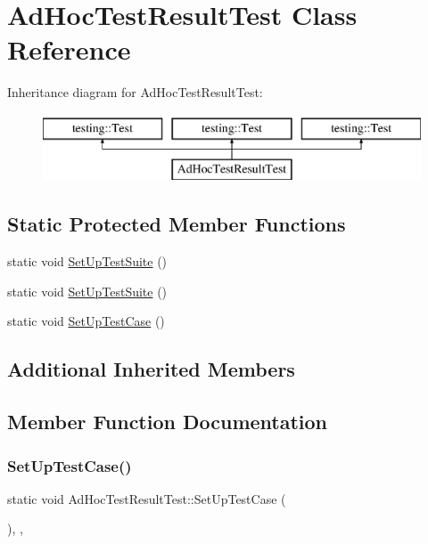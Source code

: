 \hypertarget{class_ad_hoc_test_result_test}{}\section{Ad\+Hoc\+Test\+Result\+Test Class Reference}
\label{class_ad_hoc_test_result_test}
Inheritance diagram for Ad\+Hoc\+Test\+Result\+Test\+:\begin{figure}[H]
\begin{center}
\leavevmode
\includegraphics[height=2.000000cm]{d7/d31/class_ad_hoc_test_result_test}
\end{center}
\end{figure}
\subsection*{Static Protected Member Functions}
\begin{DoxyCompactItemize}
\item 
static void \mbox{\hyperlink{class_ad_hoc_test_result_test_a4a66200ff2ff1cdaddd299dd006351f6}{Set\+Up\+Test\+Suite}} ()
\item 
static void \mbox{\hyperlink{class_ad_hoc_test_result_test_a4a66200ff2ff1cdaddd299dd006351f6}{Set\+Up\+Test\+Suite}} ()
\item 
static void \mbox{\hyperlink{class_ad_hoc_test_result_test_a0955d04d3dd7994561930c83489914a3}{Set\+Up\+Test\+Case}} ()
\end{DoxyCompactItemize}
\subsection*{Additional Inherited Members}


\subsection{Member Function Documentation}
\mbox{\label{class_ad_hoc_test_result_test_a0955d04d3dd7994561930c83489914a3}} 
\subsubsection{\texorpdfstring{SetUpTestCase()}{SetUpTestCase()}}
{\footnotesize\ttfamily static void Ad\+Hoc\+Test\+Result\+Test\+::\+Set\+Up\+Test\+Case (\begin{DoxyParamCaption}{ }\end{DoxyParamCaption})\hspace{0.3cm}{\ttfamily [inline]}, {\ttfamily [static]}, {\ttfamily [protected]}}

